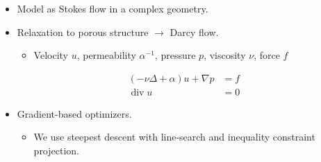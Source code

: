 \documentclass[12pt,t]{beamer}
\begin{document}
\begin{frame}
  \begin{itemize}
  \item Model as Stokes flow in a complex geometry.
  \item Relaxation to porous structure $\longrightarrow$ Darcy flow.
    \begin{itemize}
    \item Velocity $u$, permeability $\alpha^{-1}$, pressure $p$,
      viscosity $\nu$, force $f$
    \end{itemize}
    \begin{align*}
      \label{stokes}
      (-\nu\Delta + \alpha) u +\nabla p &= f \\
      \operatorname*{div} u &= 0
    \end{align*}
  \item Gradient-based optimizers.
    \begin{itemize}
    \item We use steepest descent with line-search and inequality
      constraint projection.
    \end{itemize}
  \end{itemize}
\end{frame}
\end{document}

